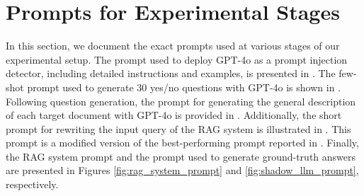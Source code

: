 \section{Prompts for Experimental Stages}
\label{app:prompts}

In this section, we document the exact prompts used at various stages of our experimental setup. The prompt used to deploy GPT-4o as a prompt injection detector, including detailed instructions and examples, is presented in . The few-shot prompt used to generate 30 yes/no questions with GPT-4o is shown in . Following question generation, the prompt for generating the general description of each target document with GPT-4o is provided in . Additionally, the short prompt for rewriting the input query of the RAG system is illustrated in . This prompt is a modified version of the best-performing prompt reported in \citep{kirchenbauer2023reliability}. Finally, the RAG system prompt and the prompt used to generate ground-truth answers are presented in Figures \ref{fig:rag_system_prompt} and \ref{fig:shadow_llm_prompt}, respectively.
